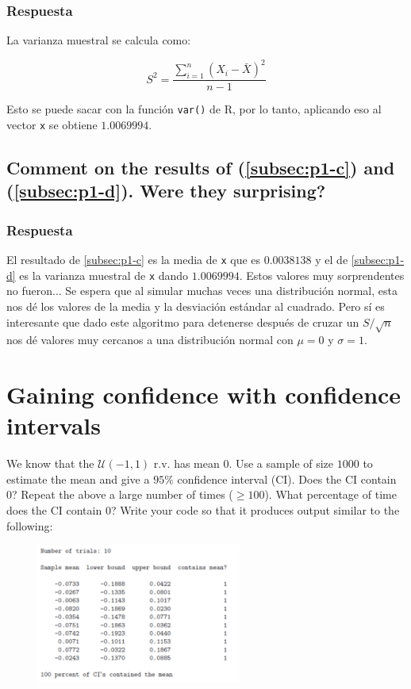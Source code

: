 \documentclass[12pt]{article}\usepackage[]{graphicx}\usepackage[]{xcolor}
\begin{document}
\subsubsection{Respuesta}

La varianza muestral se calcula como:

\[
S^{2} = \frac{\sum_{i=1}^{n} (X_{i} - \bar{X})^{2}}{n-1}
\]

Esto se puede sacar con la función \lstinline|var()| de \textsf{R}, por lo tanto, aplicando eso al vector \lstinline|x| se obtiene $1.0069994$.



\subsection{Comment on the results of (\ref{subsec:p1-c}) and (\ref{subsec:p1-d}). Were they surprising?}
\label{subsec:p1-e}

\subsubsection{Respuesta}

El resultado de \ref{subsec:p1-c} es la media de \lstinline|x| que es $0.0038138$ y el de \ref{subsec:p1-d} es la varianza muestral de \lstinline|x| dando $1.0069994$. Estos valores muy sorprendentes no fueron... Se espera que al simular muchas veces una distribución normal, esta nos dé los valores de la media y la desviación estándar al cuadrado. Pero sí es interesante que dado este algoritmo para detenerse después de cruzar un $S / \sqrt{n}$ nos dé valores muy cercanos a una distribución normal con $\mu = 0$ y $\sigma = 1$.



\section{Gaining confidence with confidence intervals}

We know that the $\mathcal{U}(-1, 1)$ r.v. has mean 0. Use a sample of size $1000$ to estimate the mean and give a $95\%$ confidence interval (CI). Does the CI contain 0? Repeat the above a large number of times ($\geq  100$). What percentage of time does the CI contain 0? Write your code so that it produces output similar to the following:


\begin{figure}[ht]
  \centering
  \includegraphics[width=0.6\textwidth]{img/Punto2.png}
\end{figure}
\end{document}

